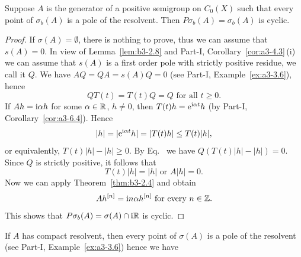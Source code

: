 \begin{theorem}\label{thm:b3-2.9}
Suppose $A$ is the generator of a positive semigroup on $C_{0}(X)$ such that every point of\/ $\sigma_{b}(A)$ is a pole of the resolvent.
Then $P\sigma_{b}(A) = \sigma_{b}(A)$ is cyclic.
\end{theorem}
\begin{proof}
	If\/ $\sigma(A) = \emptyset$, there is nothing to prove, thus we can assume that $s(A) = 0$.
	In view of Lemma~\ref{lem:b3-2.8} and Part-I,  Corollary~\ref{cor:a3-4.3}\,(i) we can assume that $s(A)$ is a first order pole with strictly positive residue, we call it $Q$.
	We have $AQ = QA = s(A)Q = 0$ (see Part-I, Example~\ref{ex:a3-3.6}), hence
	\begin{equation}\label{eq:b3-2.18}
		QT(t) = T(t)Q = Q \text{ for all } t \geq 0.
	\end{equation}
	If\/ $Ah = \mathrm{i}\alpha h$ for some $\alpha \in \mathbb{R}$, $h \neq 0$, then $T(t)h = \mathrm{e}^{\mathrm{i}\alpha t}h$ (by Part-I, Corollary~\ref{cor:a3-6.4}).
	Hence 
    \[
    |h| = |\eu^{\im\alpha t}h| = |T(t)h| \leq T(t)|h| , 
    \]
    or equivalently, $T(t)|h| - |h| \geq 0$.
	By Eq.~ we have $Q(T(t)|h| - |h|) = 0$.
	Since $Q$ is strictly positive, it follows that 
    \[
    T(t)|h| = |h| \text{ or } A|h| = 0 .
    \]
	Now we can apply Theorem~\ref{thm:b3-2.4} and obtain 
    \[
    Ah^{[n]} = \mathrm{i} n\alpha h^{[n]} \text{ for every } n \in \mathbb{Z} .
    \]
	This shows that $P\sigma_{b}(A) = \sigma(A) \cap \mathrm{i}\mathbb{R}$ is cyclic.
\end{proof}
If\/ $A$ has compact resolvent, then every point of\/ $\sigma(A)$ is a pole of the resolvent (see Part-I, Example~\ref{ex:a3-3.6}) hence we have

